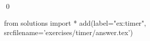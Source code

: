 
    \begin{ex}
  \label{ex:timer}
  
  \qed
\end{ex}
\begin{python0}
from solutions import *
add(label="ex:timer",
    srcfilename='exercises/timer/answer.tex') 
\end{python0}                              
